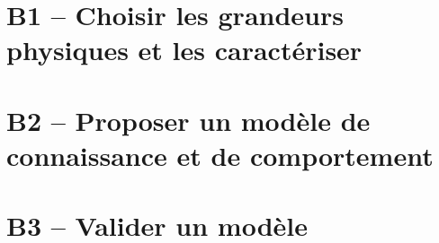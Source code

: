 \proffalse

\section{B1 -- Choisir les grandeurs physiques et les caractériser}

\section{B2 -- Proposer un modèle de connaissance et de comportement}
\begin{multicols}{2}











\end{multicols}

\section{B3 -- Valider un modèle}


%
%
%
%
%
%
%
%
%
%
%
%
